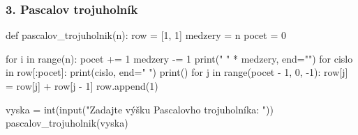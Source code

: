 \subsubsection*{3. Pascalov trojuholník}
\begin{solution}
def pascalov_trojuholnik(n):
    row = [1, 1]
    medzery = n
    pocet = 0

    for i in range(n):
        pocet += 1
        medzery -= 1
        print(" " * medzery, end="")
        for cislo in row[:pocet]:
            print(cislo, end=" ")
        print()
        for j in range(pocet - 1,  0, -1):
            row[j] = row[j] + row[j - 1]
        row.append(1)

vyska = int(input("Zadajte výšku Pascalovho trojuholníka: "))
pascalov_trojuholnik(vyska)
\end{solution}

